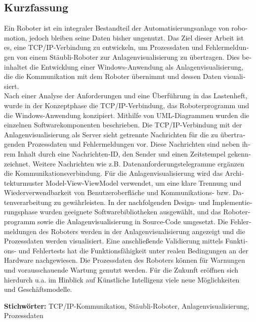 \cleardoublepage

\begin{otherlanguage}{ngerman}
\chapter*{Kurzfassung}
Ein Roboter ist ein integraler Bestandteil der Automatisierungsanlage von robomotion, jedoch bleiben seine Daten bisher ungenutzt. Das Ziel dieser Arbeit ist es, eine TCP/IP-Verbindung zu entwickeln, um Prozessdaten und Fehlermeldungen von einem Stäubli-Roboter zur Anlagenvisualisierung zu übertragen. Dies beinhaltet die Entwicklung einer Windows-Anwendung als Anlagenvisualisierung, die die Kommunikation mit dem Roboter übernimmt und dessen Daten visualisiert.\\
Nach einer Analyse der Anforderungen und eine Überführung in das Lastenheft, wurde in der Konzeptphase die TCP/IP-Verbindung, das Roboterprogramm und die Windows-Anwendung konzipiert. Mithilfe von UML-Diagrammen wurden die einzelnen Softwarekomponenten beschrieben. Die TCP/IP-Verbindung mit der Anlagenvisualisierung als Server sieht getrennte Nachrichten für die zu übertragenden Prozessdaten und Fehlermeldungen vor. Diese Nachrichten sind neben ihrem Inhalt durch eine Nachrichten-ID, den Sender und einen Zeitstempel gekennzeichnet. Weitere Nachrichten wie z.B. Datenanforderungstelegramme ergänzen die Kommunikationsverbindung. Für die Anlagenvisualisierung wird das Architekturmuster Model-View-ViewModel verwendet, um eine klare Trennung und Wiederverwendbarkeit von Benutzeroberfläche und Kommunikations- bzw. Datenverarbeitung zu gewährleisten. In der nachfolgenden Design- und Implementierungsphase wurden geeignete Softwarebibliotheken ausgewählt, und das Roboterprogramm sowie die Anlagenvisualisierung in Source-Code umgesetzt. Die Fehlermeldungen des Roboters werden in der Anlagenvisualisierung angezeigt und die Prozessdaten werden visualisiert. Eine anschließende Validierung mittels Funktions- und Fehlertests hat die Funktionsfähigkeit unter realen Bedingungen an der Hardware nachgewiesen. Die Prozessdaten des Roboters können für Warnungen und vorausschauende Wartung genutzt werden. Für die Zukunft eröffnen sich hierdurch u.a. im Hinblick auf Künstliche Intelligenz viele neue Möglichkeiten und Geschäftsmodelle.


\vfill
\noindent\textbf{Stichwörter:} TCP/IP-Kommunikation, Stäubli-Roboter, Anlagenvisualisierung, Prozessdaten
\vfill
\end{otherlanguage}
